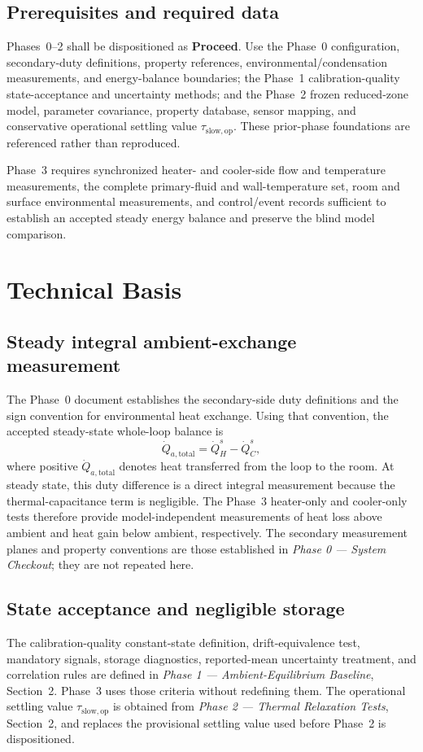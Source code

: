 \documentclass[11pt]{article}
\newcommand{\QHs}{\dot Q_{H}^{s}}
\newcommand{\QCs}{\dot Q_{C}^{s}}
\newcommand{\PhaseZeroDoc}{\textit{Phase 0 --- System Checkout}}
\newcommand{\PhaseOneDoc}{\textit{Phase 1 --- Ambient-Equilibrium Baseline}}
\newcommand{\PhaseTwoDoc}{\textit{Phase 2 --- Thermal Relaxation Tests}}
\begin{document}
\subsection{Prerequisites and required data}
Phases~0--2 shall be dispositioned as \textbf{Proceed}. Use the Phase~0 configuration, secondary-duty definitions, property references, environmental/condensation measurements, and energy-balance boundaries; the Phase~1 calibration-quality state-acceptance and uncertainty methods; and the Phase~2 frozen reduced-zone model, parameter covariance, property database, sensor mapping, and conservative operational settling value $\tau_{\mathrm{slow,op}}$. These prior-phase foundations are referenced rather than reproduced.

Phase~3 requires synchronized heater- and cooler-side flow and temperature measurements, the complete primary-fluid and wall-temperature set, room and surface environmental measurements, and control/event records sufficient to establish an accepted steady energy balance and preserve the blind model comparison.

\clearpage
\section{Technical Basis}
\label{sec:technical_basis}
\subsection{Steady integral ambient-exchange measurement}
The Phase~0 document establishes the secondary-side duty definitions and the sign convention for environmental heat exchange. Using that convention, the accepted steady-state whole-loop balance is
\begin{equation}
    \dot Q_{a,\mathrm{total}}=\QHs-\QCs,
    \label{eq:whole_loop_loss}
\end{equation}
where positive $\dot Q_{a,\mathrm{total}}$ denotes heat transferred from the loop to the room. At steady state, this duty difference is a direct integral measurement because the thermal-capacitance term is negligible. The Phase~3 heater-only and cooler-only tests therefore provide model-independent measurements of heat loss above ambient and heat gain below ambient, respectively. The secondary measurement planes and property conventions are those established in \PhaseZeroDoc; they are not repeated here.

\subsection{State acceptance and negligible storage}
The calibration-quality constant-state definition, drift-equivalence test, mandatory signals, storage diagnostics, reported-mean uncertainty treatment, and correlation rules are defined in \PhaseOneDoc, Section~2. Phase~3 uses those criteria without redefining them. The operational settling value $\tau_{\mathrm{slow,op}}$ is obtained from \PhaseTwoDoc, Section~2, and replaces the provisional settling value used before Phase~2 is dispositioned.
\end{document}
